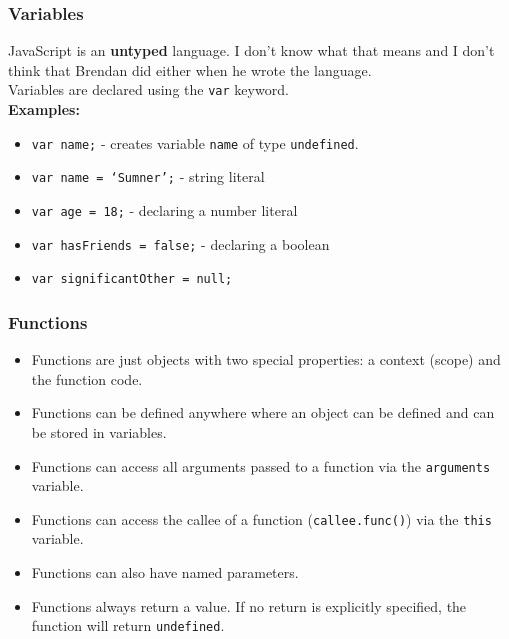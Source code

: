 \documentclass{lug}
\begin{document}
\begin{frame}
    \frametitle{Variables}

    JavaScript is an \textbf{untyped} language. I don't know what that means and I don't
    think that Brendan did either when he wrote the language.\\

    Variables are declared using the \texttt{var} keyword\footnotemark[1]. \\

    \textbf{Examples:}

    \begin{itemize}
        \item \texttt{var name;} - creates variable \texttt{name} of type \texttt{undefined}.
        \item \texttt{var name = `Sumner';} - string literal
        \item \texttt{var age = 18;} - declaring a number literal
        \item \texttt{var hasFriends = false;} - declaring a boolean
        \item \texttt{var significantOther = null;}
    \end{itemize}

\end{frame}

\begin{frame}
    \frametitle{Functions}

    \begin{itemize}[<+->]
        \item Functions are just objects with two special properties: a context (scope) and the
            function code.
        \item Functions can be defined anywhere where an object can be defined and can be stored in
            variables.
        \item Functions can access all arguments passed to a function via the \texttt{arguments}
            variable.
        \item Functions can access the callee of a function (\texttt{callee.func()}) via the
            \texttt{this} variable.
        \item Functions can also have named parameters.
        \item Functions always return a value. If no return is explicitly specified, the function
            will return \texttt{undefined}.
    \end{itemize}
\end{frame}
\end{document}
